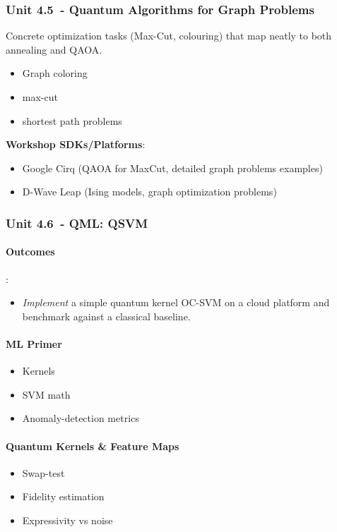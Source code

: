 \subsubsection*{Unit 4.5 - Quantum Algorithms for Graph Problems}

Concrete optimization tasks (Max-Cut, colouring) that map neatly to both annealing and QAOA.

\emph{}
\begin{itemize}
	\item Graph coloring
	\item max-cut
	\item shortest path problems
\end{itemize}

\textbf{Workshop SDKs/Platforms}:
\begin{itemize}
	\item Google Cirq (QAOA for MaxCut, detailed graph problems examples)
	\item D-Wave Leap (Ising models, graph optimization problems)
\end{itemize}


\subsubsection*{Unit 4.6 - QML: QSVM}

\paragraph{Outcomes}:
\begin{itemize}
	\item \emph{Implement} a simple quantum kernel OC-SVM on a cloud platform and benchmark against a classical baseline.
\end{itemize}

\paragraph{ML Primer}
\begin{itemize}
	\item Kernels
	\item SVM math
	\item Anomaly-detection metrics
\end{itemize}

\paragraph{Quantum Kernels \& Feature Maps}
\begin{itemize}
	\item Swap-test
	\item Fidelity estimation
	\item Expressivity vs noise
\end{itemize}

